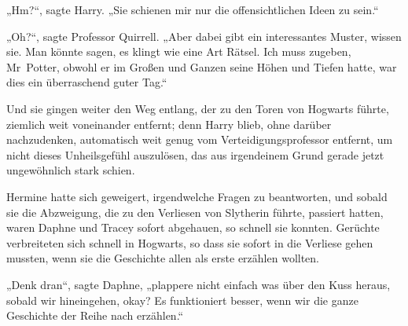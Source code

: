 „Hm?“, sagte Harry.
„Sie schienen mir nur die offensichtlichen Ideen zu sein.“

„Oh?“, sagte Professor Quirrell.
„Aber dabei gibt ein interessantes Muster, wissen sie. Man könnte sagen, es klingt wie eine Art Rätsel. Ich muss zugeben, Mr~Potter, obwohl er im Großen und Ganzen seine Höhen und Tiefen hatte, war dies ein überraschend guter Tag.“

Und sie gingen weiter den Weg entlang, der zu den Toren von Hogwarts führte, ziemlich weit voneinander entfernt; denn Harry blieb, ohne darüber nachzudenken, automatisch weit genug vom Verteidigungsprofessor entfernt, um nicht dieses Unheilsgefühl auszulösen, das aus irgendeinem Grund gerade jetzt ungewöhnlich stark schien.


Hermine hatte sich geweigert, irgendwelche Fragen zu beantworten, und sobald sie die Abzweigung, die zu den Verliesen von Slytherin führte, passiert hatten, waren Daphne und Tracey sofort abgehauen, so schnell sie konnten. Gerüchte verbreiteten sich schnell in Hogwarts, so dass sie sofort in die Verliese gehen mussten, wenn sie die Geschichte allen als erste erzählen wollten.

„Denk dran“, sagte Daphne, „plappere nicht einfach was über den Kuss heraus, sobald wir hineingehen, okay? Es funktioniert besser, wenn wir die ganze Geschichte der Reihe nach erzählen.“


